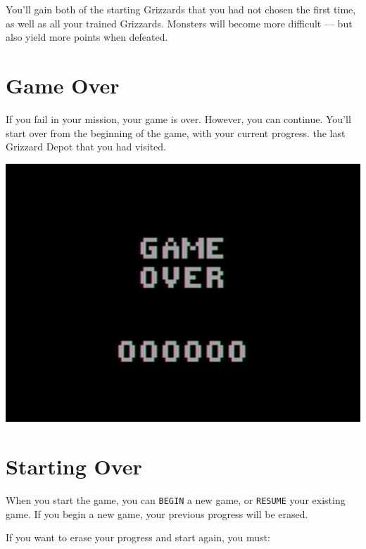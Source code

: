 \documentclass[10pt,twocolumn,openany,article]{memoir}
\begin{document}
You'll gain both  of the starting Grizzards that you  had not chosen the
first time, as well as all  your trained Grizzards. Monsters will become
more difficult — but also yield more points when defeated.

\section{Game Over}

If  you fail  in  your mission,  your  game is  over.  However, you  can
continue. You'll start over from  \ifdefined\NOSAVE the beginning of the
game, with your current progress. \else the last Grizzard Depot that you
had visited. \fi

\begin{center}
  \includegraphics[width=\columnwidth]{../Manual/GameOverNTSC.png}
\end{center}

\section{Starting Over}\label{Starting Your Adventure Over}

\ifdefined\NOSAVE

When  you  start  the  game,  you can  \texttt{BEGIN}  a  new  game,  or
\texttt{RESUME}  your existing  game.  If  you begin  a  new game,  your
previous progress will be erased.

\else

If you want to erase your progress and start again, you must:
\end{document}
